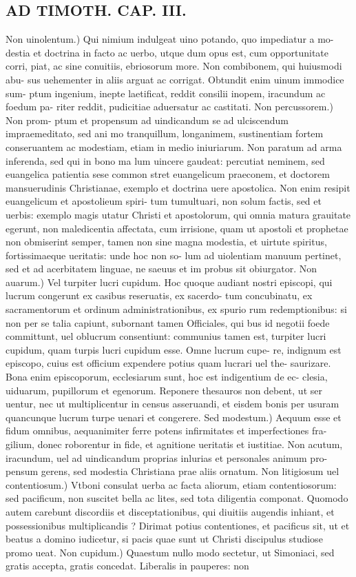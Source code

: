 \documentclass{article}
\begin{document}
\begin{pages}
\section*{AD TIMOTH. CAP. III. }
\marginpar{[ p.497 ]}\pstart Non uinolentum.) Qui nimium indulgeat uino potando, quo impediatur a mo- destia et doctrina in facto ac uerbo, utque dum opus est, cum opportunitate corri, piat, ac sine conuitiis, ebriosorum more. Non combibonem, qui huiusmodi abu- sus uehementer in aliis arguat ac corrigat. Obtundit enim uinum immodice sum- ptum ingenium, inepte laetificat, reddit consilii inopem, iracundum ac foedum pa- riter reddit, pudicitiae aduersatur ac castitati. Non percussorem.) Non prom- ptum et propensum ad uindicandum se ad ulciscendum impraemeditato, sed ani mo tranquillum, longanimem, sustinentiam fortem conseruantem ac modestiam, etiam in medio iniuriarum. Non paratum ad arma inferenda, sed qui in bono ma lum uincere gaudeat: percutiat neminem, sed euangelica patientia sese common stret euangelicum praeconem, et doctorem mansuerudinis Christianae, exemplo et doctrina uere apostolica. Non enim resipit euangelicum et apostolieum spiri- tum tumultuari, non solum factis, sed et uerbis: exemplo magis utatur Christi et apostolorum, qui omnia matura grauitate egerunt, non maledicentia affectata, cum irrisione, quam ut apostoli et prophetae non obmiserint semper, tamen non sine magna modestia, et uirtute spiritus, fortissimaeque ueritatis: unde hoc non so- lum ad uiolentiam manuum pertinet, sed et ad acerbitatem linguae, ne saeuus et im probus sit obiurgator. Non auarum.) Vel turpiter lucri cupidum. Hoc quoque  audiant nostri episcopi, qui lucrum congerunt ex casibus reseruatis, ex sacerdo- tum concubinatu, ex sacramentorum et ordinum administrationibus, ex spurio rum redemptionibus: si non per se talia capiunt, subornant tamen Officiales, qui bus id negotii foede committunt, uel oblucrum consentiunt: communius tamen est, turpiter lucri cupidum, quam turpis lucri cupidum esse. Omne lucrum cupe- re, indignum est episcopo, cuius est officium expendere potius quam lucrari uel the- saurizare. Bona enim episcoporum, ecclesiarum sunt, hoc est indigentium de ec- clesia, uiduarum, pupillorum et egenorum. Reponere thesauros non debent, ut ser uentur, nec ut multiplicentur in census asseruandi, et eisdem bonis per usuram quancunque lucrum turpe uenari et congerere. Sed modestum.) Aequum esse et fidum omnibus, aequanimiter ferre potens infirmitates et imperfectiones fra- gilium, donec roborentur in fide, et agnitione ueritatis et iustitiae. Non acutum, iracundum, uel ad uindicandum proprias inlurias et personales animum pro- pensum gerens, sed modestia Christiana prae aliis ornatum. Non litigiosum uel contentiosum.) Vtboni consulat uerba ac facta aliorum, etiam contentiosorum: sed pacificum, non suscitet bella ac lites, sed tota diligentia componat. Quomodo autem carebunt discordiis et disceptationibus, qui diuitiis augendis inhiant, et possessionibus multiplicandis ? Dirimat potius contentiones, et pacificus sit, ut et beatus a domino iudicetur, si pacis quae sunt ut Christi discipulus studiose promo ueat. Non cupidum.) Quaestum nullo modo sectetur, ut Simoniaci, sed gratis accepta, gratis concedat. Liberalis in pauperes: non 
\end{pages}
\end{document}
